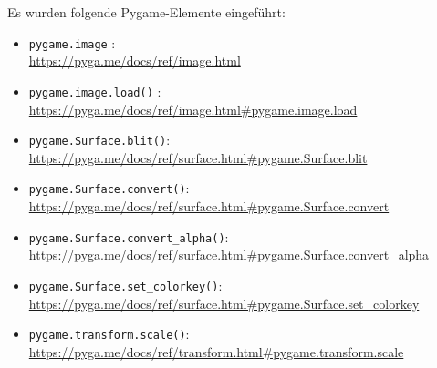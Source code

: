 Es wurden folgende Pygame-Elemente eingeführt:

\begin{itemize}
	\item \texttt{pygame.image}
	:\\
	\url{https://pyga.me/docs/ref/image.html}
	
	\item \texttt{pygame.image.load()}
	:\\
	\url{https://pyga.me/docs/ref/image.html#pygame.image.load}
	
	\item \texttt{pygame.Surface.blit()}:
	\\
	\url{https://pyga.me/docs/ref/surface.html#pygame.Surface.blit}
	
	\item \texttt{pygame.Surface.convert()}:
	\\
	\url{https://pyga.me/docs/ref/surface.html#pygame.Surface.convert}
	
	\item \texttt{pygame.Surface.convert\_alpha()}:
	\\
	\url{https://pyga.me/docs/ref/surface.html#pygame.Surface.convert\_alpha}
	
	\item \texttt{pygame.Surface.set\_colorkey()}:
	\\
	\url{https://pyga.me/docs/ref/surface.html#pygame.Surface.set\_colorkey}
	
	\item \texttt{pygame.transform.scale()}:
	\\
	\url{https://pyga.me/docs/ref/transform.html#pygame.transform.scale}
	
\end{itemize}


